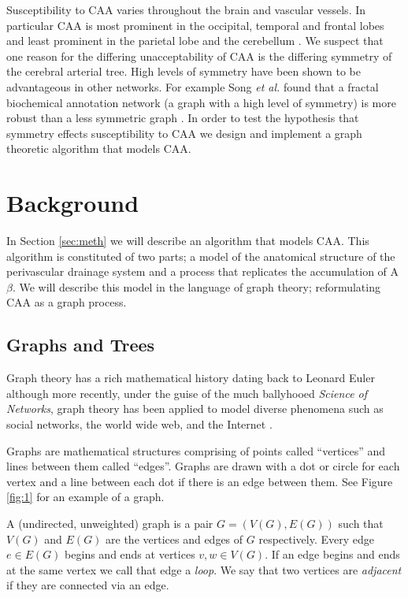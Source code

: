 \documentclass[10pt]{amsart} %
\theoremstyle{definition}
\begin{document}
Susceptibility to CAA varies throughout the brain and vascular vessels.  In particular  
CAA  is most prominent in the occipital, temporal and frontal lobes and least prominent in the parietal lobe and the cerebellum %
\cite{Preston}. We suspect that one reason for the differing unacceptability of CAA is the differing symmetry of the cerebral arterial tree.  High levels of symmetry have been shown to be advantageous in other networks.  For example Song \emph{et al.} found that a fractal biochemical annotation  network (a graph with a high level of symmetry) is more robust than a less symmetric graph \cite{Song}.  In order to test the hypothesis that symmetry effects susceptibility to CAA we design and implement a graph theoretic algorithm that models CAA.%


\section{Background}

In Section \ref{sec:meth} we will describe an algorithm that models CAA.  This algorithm is constituted of two parts; a model of the anatomical structure of the perivascular drainage system and a process that replicates the accumulation of A$\beta$.  We will describe this model in the language of graph theory; reformulating CAA as a graph process.      

\subsection{Graphs and Trees}
Graph theory has a rich mathematical history dating back to Leonard Euler although more recently, under the guise of the much ballyhooed \emph{Science of Networks}, graph theory has been applied to model diverse phenomena such as social networks, the world wide web, and the Internet \cite{barabasi,bigg}.

Graphs are mathematical structures comprising of points called ``vertices'' and lines between them called ``edges''.  Graphs are drawn with a dot or circle for each vertex and a line between each dot if there is an edge between them.  See Figure \ref{fig:1} for an example of a graph.     

A (undirected, unweighted) graph is a pair $G = (V(G),E(G))$ such that $V(G)$ and $E(G)$ are the vertices and edges of $G$ respectively. Every edge $e \in E(G)$ begins and ends at vertices $ v,w \in V(G)$. If an edge begins and ends at the same vertex we call that edge a \emph{loop}.  We say that two vertices are \emph{adjacent} if they are connected via an edge.
\end{document}
